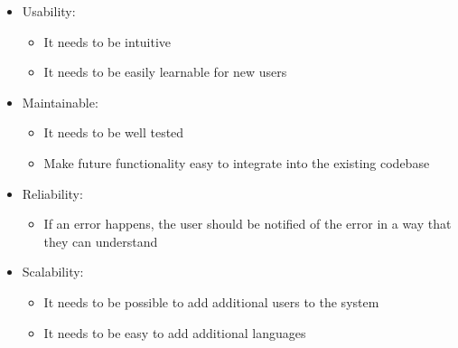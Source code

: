 \begin{itemize}
    \item Usability:
    \begin{itemize}
        \item It needs to be intuitive
        \item It needs to be easily learnable for new users
    \end{itemize}
    \item Maintainable:
    \begin{itemize}
        \item It needs to be well tested
        \item Make future functionality easy to integrate into the existing codebase
    \end{itemize}
    \item Reliability:
    \begin{itemize}
        \item If an error happens, the user should be notified of the error in a way that they can understand
    \end{itemize}
    \item Scalability:
    \begin{itemize}
        \item It needs to be possible to add additional users to the system
        \item It needs to be easy to add additional languages
    \end{itemize}
\end{itemize}
